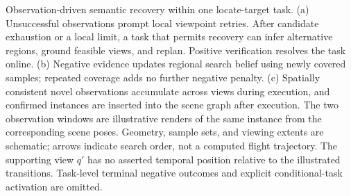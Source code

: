 \caption{Observation-driven semantic recovery within one locate-target task. (a) Unsuccessful observations prompt local viewpoint retries. After candidate exhaustion or a local limit, a task that permits recovery can infer alternative regions, ground feasible views, and replan. Positive verification resolves the task online. (b) Negative evidence updates regional search belief using newly covered samples; repeated coverage adds no further negative penalty. (c) Spatially consistent novel observations accumulate across views during execution, and confirmed instances are inserted into the scene graph after execution. The two observation windows are illustrative renders of the same instance from the corresponding scene poses. Geometry, sample sets, and viewing extents are schematic; arrows indicate search order, not a computed flight trajectory. The supporting view $q'$ has no asserted temporal position relative to the illustrated transitions. Task-level terminal negative outcomes and explicit conditional-task activation are omitted.}
